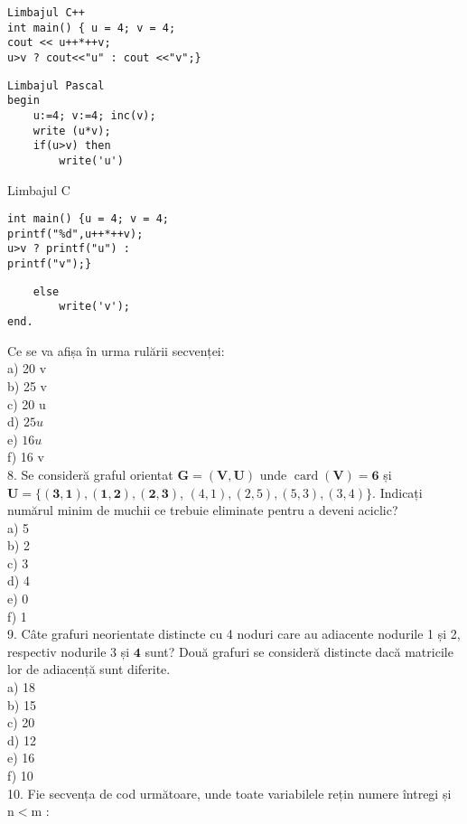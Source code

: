 \begin{verbatim}
Limbajul C++
int main() { u = 4; v = 4;
cout << u++*++v;
u>v ? cout<<"u" : cout <<"v";}
\end{verbatim}

\begin{verbatim}
Limbajul Pascal
begin
    u:=4; v:=4; inc(v);
    write (u*v);
    if(u>v) then
        write('u')
\end{verbatim}

Limbajul C

\begin{verbatim}
int main() {u = 4; v = 4;
printf("%d",u++*++v);
u>v ? printf("u") :
printf("v");}
\end{verbatim}

\begin{verbatim}
    else
        write('v');
end.
\end{verbatim}

Ce se va afișa în urma rulării secvenței:\\
a) 20 v\\
b) 25 v\\
c) 20 u\\
d) $25 u$\\
e) $16 u$\\
f) 16 v\\
8. Se consideră graful orientat $\mathbf{G}=(\mathbf{V}, \mathbf{U})$ unde $\operatorname{card}(\mathbf{V})=\mathbf{6}$ și $\mathbf{U}=\{(\mathbf{3}, \mathbf{1}),(\mathbf{1}, \mathbf{2}),(\mathbf{2}, \mathbf{3})$, $(4,1),(2,5),(5,3),(3,4)\}$. Indicați numărul minim de muchii ce trebuie eliminate pentru a deveni aciclic?\\
a) 5\\
b) 2\\
c) 3\\
d) 4\\
e) 0\\
f) 1\\
9. Câte grafuri neorientate distincte cu 4 noduri care au adiacente nodurile 1 și 2, respectiv nodurile 3 și $\mathbf{4}$ sunt? Două grafuri se consideră distincte dacă matricile lor de adiacență sunt diferite.\\
a) 18\\
b) 15\\
c) 20\\
d) 12\\
e) 16\\
f) 10\\
10. Fie secvența de cod următoare, unde toate variabilele rețin numere întregi și $\mathrm{n}<\mathrm{m}$ :

